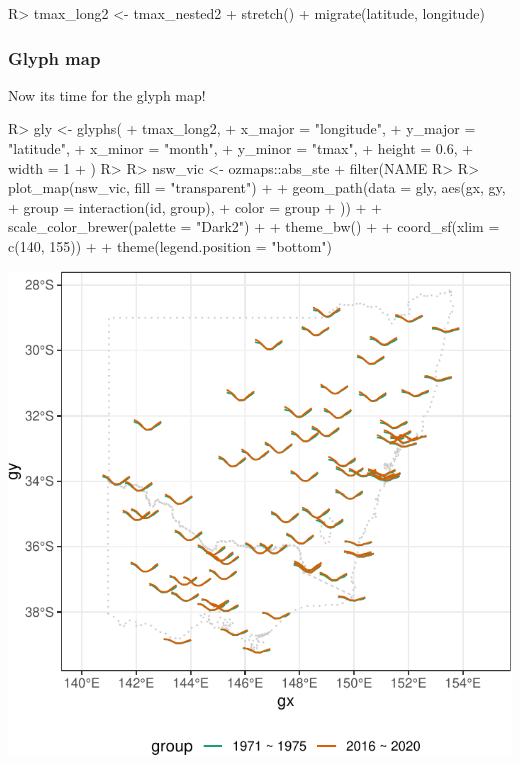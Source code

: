 \documentclass[
]{jss}
\begin{document}
\begin{CodeChunk}
\begin{CodeInput}
R> tmax_long2 <- tmax_nested2 %
+   stretch() %
+   migrate(latitude, longitude)
\end{CodeInput}
\end{CodeChunk}

\hypertarget{glyph-map}{%
\subsubsection{Glyph map}\label{glyph-map}}

Now its time for the glyph map!

\begin{CodeChunk}
\begin{CodeInput}
R> gly <- glyphs(
+   tmax_long2,
+   x_major = "longitude",
+   y_major = "latitude",
+   x_minor = "month",
+   y_minor = "tmax",
+   height = 0.6,
+   width = 1
+ )
R> 
R> nsw_vic <- ozmaps::abs_ste %
+   filter(NAME %
R> 
R> plot_map(nsw_vic, fill = "transparent") +
+   geom_path(data = gly, aes(gx, gy,
+     group = interaction(id, group),
+     color = group
+   )) +
+   scale_color_brewer(palette = "Dark2") + 
+   theme_bw() + 
+   coord_sf(xlim = c(140, 155)) + 
+   theme(legend.position = "bottom")
\end{CodeInput}


\begin{center}\includegraphics{figures/unnamed-chunk-10-1} \end{center}

\end{CodeChunk}
\end{document}
